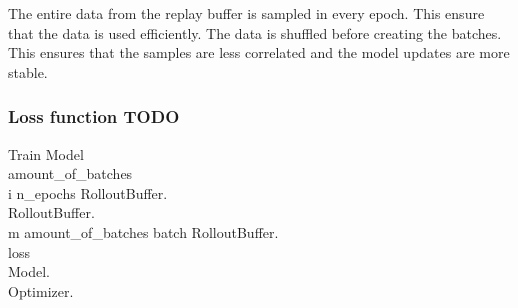 The entire data from the replay buffer is sampled in every epoch. This ensure that the data is used efficiently. The data is shuffled before creating the batches. This ensures that the samples are less correlated and the model updates are more stable.

\subsubsection{Loss function TODO}


\renewcommand{\thepseudonum}{\roman{pseudonum}}
\begin{pseudocode}{Train Model}{ }
\\

amount\_of\_batches \GETS {}\\
\FOR i  \TO n\_epochs \DO
\BEGIN
RolloutBuffer.\\
RolloutBuffer.\\
\FOR m  \TO amount\_of\_batches \DO
\BEGIN
batch \GETS RolloutBuffer.\\
loss \GETS {}\\
Model.\\
Optimizer.\\
\END\\
\END
\ENDPROCEDURE

\end{pseudocode}



